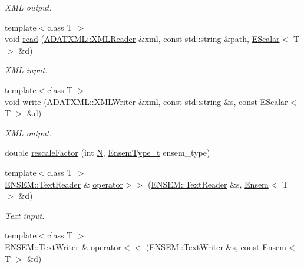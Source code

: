 \begin{DoxyCompactItemize}
\begin{DoxyCompactList}\small\item\em X\+ML output. \end{DoxyCompactList}\item 
{\footnotesize template$<$class T $>$ }\\void \mbox{\hyperlink{group__escalar_ga5631206e233cf75b5fb2ff13ee8b77ac}{read}} (\mbox{\hyperlink{classADATXML_1_1XMLReader}{A\+D\+A\+T\+X\+M\+L\+::\+X\+M\+L\+Reader}} \&xml, const std\+::string \&path, \mbox{\hyperlink{classENSEM_1_1EScalar}{E\+Scalar}}$<$ T $>$ \&d)
\begin{DoxyCompactList}\small\item\em X\+ML input. \end{DoxyCompactList}\item 
{\footnotesize template$<$class T $>$ }\\void \mbox{\hyperlink{group__escalar_ga2e7afe18081ed96c569177362d6bb43d}{write}} (\mbox{\hyperlink{classADATXML_1_1XMLWriter}{A\+D\+A\+T\+X\+M\+L\+::\+X\+M\+L\+Writer}} \&xml, const std\+::string \&s, const \mbox{\hyperlink{classENSEM_1_1EScalar}{E\+Scalar}}$<$ T $>$ \&d)
\begin{DoxyCompactList}\small\item\em X\+ML output. \end{DoxyCompactList}\item 
double \mbox{\hyperlink{group__eensem_ga01418f9a0c64b71fae7f8d400a68f25e}{rescale\+Factor}} (int \mbox{\hyperlink{operator__name__util_8cc_a7722c8ecbb62d99aee7ce68b1752f337}{N}}, \mbox{\hyperlink{namespaceENSEM_a2dc2c4a26884f343471e52f23479ddbe}{Ensem\+Type\+\_\+t}} ensem\+\_\+type)
\item 
{\footnotesize template$<$class T $>$ }\\\mbox{\hyperlink{classENSEM_1_1TextReader}{E\+N\+S\+E\+M\+::\+Text\+Reader}} \& \mbox{\hyperlink{group__eensem_ga607184316d75a7cc8f6e0b082332832e}{operator$>$$>$}} (\mbox{\hyperlink{classENSEM_1_1TextReader}{E\+N\+S\+E\+M\+::\+Text\+Reader}} \&s, \mbox{\hyperlink{classENSEM_1_1Ensem}{Ensem}}$<$ T $>$ \&d)
\begin{DoxyCompactList}\small\item\em Text input. \end{DoxyCompactList}\item 
{\footnotesize template$<$class T $>$ }\\\mbox{\hyperlink{classENSEM_1_1TextWriter}{E\+N\+S\+E\+M\+::\+Text\+Writer}} \& \mbox{\hyperlink{group__eensem_ga6ec953adfd003a66dd85074b0e1ad399}{operator$<$$<$}} (\mbox{\hyperlink{classENSEM_1_1TextWriter}{E\+N\+S\+E\+M\+::\+Text\+Writer}} \&s, const \mbox{\hyperlink{classENSEM_1_1Ensem}{Ensem}}$<$ T $>$ \&d)

\end{DoxyCompactItemize}
